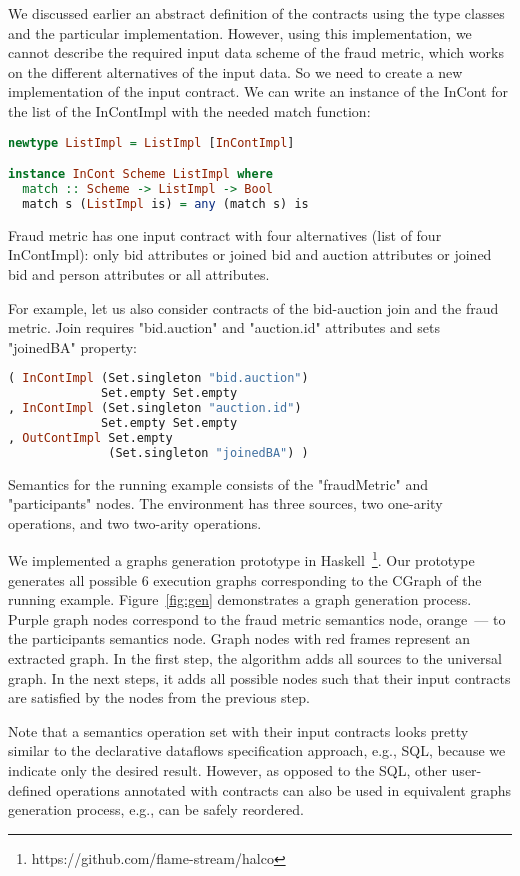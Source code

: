 We discussed earlier an abstract definition of the contracts using the type classes and the particular implementation.
However, using this implementation, we cannot describe the required input data scheme of the fraud metric, which works on the different alternatives of the input data.
So we need to create a new implementation of the input contract.
We can write an instance of the InCont for the list of the InContImpl with the needed match function:

\begin{lstlisting}[language=Haskell]
newtype ListImpl = ListImpl [InContImpl]

instance InCont Scheme ListImpl where
  match :: Scheme -> ListImpl -> Bool
  match s (ListImpl is) = any (match s) is
\end{lstlisting}

Fraud metric has one input contract with four alternatives (list of four InContImpl):
only bid attributes
or joined bid and auction attributes
or joined bid and person attributes
or all attributes.

For example, let us also consider contracts of the bid-auction join and the fraud metric.
Join requires "bid.auction" and "auction.id" attributes and sets "joinedBA" property:
\begin{lstlisting}[language=Haskell]
( InContImpl (Set.singleton "bid.auction")
             Set.empty Set.empty
, InContImpl (Set.singleton "auction.id")
             Set.empty Set.empty
, OutContImpl Set.empty
              (Set.singleton "joinedBA") )
\end{lstlisting}

Semantics for the running example consists of the "fraudMetric" and "participants" nodes.
The environment has three sources, two one-arity operations, and two two-arity operations.

We implemented a graphs generation prototype in Haskell~\footnote{https://github.com/flame-stream/halco}.
Our prototype generates all possible 6 execution graphs corresponding to the CGraph of the running example. Figure~\ref{fig:gen} demonstrates a graph generation process.
Purple graph nodes correspond to the fraud metric semantics node, orange~--- to the participants semantics node.
Graph nodes with red frames represent an extracted graph.
In the first step, the algorithm adds all sources to the universal graph.
In the next steps, it adds all possible nodes such that their input contracts are satisfied by the nodes from the previous step.

Note that a semantics operation set with their input contracts looks pretty similar to the declarative dataflows specification approach, e.g., SQL, because we indicate only the desired result.
However, as opposed to the SQL, other user-defined operations annotated with contracts can also be used in equivalent graphs generation process, e.g., can be safely reordered.
